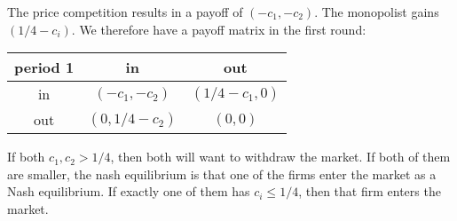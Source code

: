    
\begin{center}
    \end{center}
    The price competition results in a payoff of $(-c_1,-c_2)$. The monopolist gains $(1/4-c_i)$.
    We therefore have a payoff matrix in the first round:
    \begin{center}
        \begin{tabular}{|c|c c|}
            \hline period 1& in & out\\
                \hline  in & $(-c_1,-c_2)$ & $(1/4-c_1,0)$\\ \hline out& $(0,1/4-c_2)$ & $(0,0)$\\ \hline
        \end{tabular}
    \end{center}
    If both $c_1,c_2>1/4$, then both will want to withdraw the market. If both of them are smaller, the nash equilibrium is that one of the firms enter the market as a Nash equilibrium. If exactly one of them has $c_i\leq 1/4$, then that firm enters the market.

    